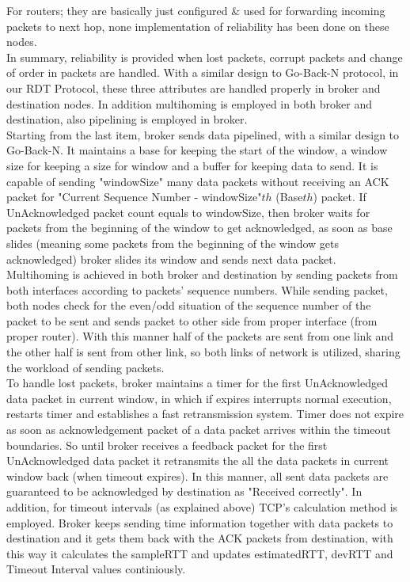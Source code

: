 \documentclass[conference]{IEEEtran}
\begin{document}
For routers; they are basically just configured \& used for forwarding incoming packets to next hop, none implementation of reliability has been done on these nodes. \\

In summary, reliability is provided when lost packets, corrupt packets and change of order in packets are handled. With a similar design to Go-Back-N protocol, in our RDT Protocol, these three attributes are handled properly in broker and destination nodes. In addition multihoming is employed in both broker and destination, also pipelining is employed in broker. \\

Starting from the last item, broker sends data pipelined, with a similar design to Go-Back-N. It maintains a base for keeping the start of the window, a window size for keeping a size for window and a buffer for keeping data to send. It is capable of sending "windowSize" many data packets without receiving an ACK packet for "Current Sequence Number - windowSize"$th$ (Base$th$) packet. If UnAcknowledged packet count equals to windowSize, then broker waits for packets from the beginning of the window to get acknowledged, as soon as base slides (meaning some packets from the beginning of the window gets acknowledged) broker slides its window and sends next data packet. \\

Multihoming is achieved in both broker and destination by sending packets from both interfaces according to packets' sequence numbers. While sending packet, both nodes check for the even/odd situation of the sequence number of the packet to be sent and sends packet to other side from proper interface (from proper router). With this manner half of the packets are sent from one link and the other half is sent from other link, so both links of network is utilized, sharing the workload of sending packets. \\

To handle lost packets, broker maintains a timer for the first UnAcknowledged data packet in current window, in which if expires interrupts normal execution, restarts timer and establishes a fast retransmission system. Timer does not expire as soon as acknowledgement packet of a data packet arrives within the timeout boundaries. So until broker receives a feedback packet for the first UnAcknowledged data packet it retransmits the all the data packets in current window back (when timeout expires). In this manner, all sent data packets are guaranteed to be acknowledged by destination as "Received correctly". In addition, for timeout intervals (as explained above) TCP's calculation method is employed. Broker keeps sending time information together with data packets to destination and it gets them back with the ACK packets from destination, with this way it calculates the sampleRTT and updates estimatedRTT, devRTT and Timeout Interval values continiously. \\ 
\end{document}
